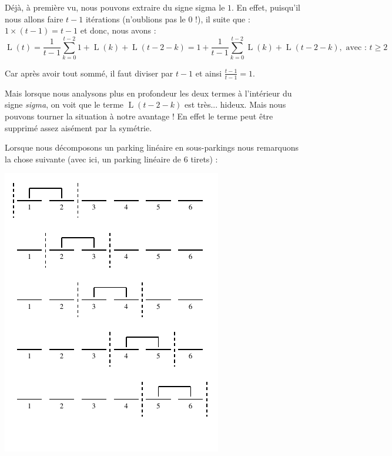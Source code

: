 \documentclass[a4paper,francais,11pt]{article}
\begin{document}
Déjà, à première vu, nous pouvons extraire du signe sigma le $1$. En effet, puisqu'il nous allons faire $t-1$ itérations (n'oublions pas le $0$ !), il suite que : $1\times\left(t-1\right)=t-1$ et donc, nous avons :
\[\operatorname{L}\left(t\right)=\frac{1}{t-1}\sum_{k=0}^{t-2}1+\operatorname{L}\left(k\right) + \operatorname{L}\left(t-2-k\right)=1+\frac{1}{t-1}\sum_{k=0}^{t-2}\operatorname{L}\left(k\right) + \operatorname{L}\left(t-2-k\right),\text{ avec : $t\geqslant2$}\]

Car après avoir tout sommé, il faut diviser par $t-1$ et ainsi $\frac{t-1}{t-1}=1$. 

Mais lorsque nous analysons plus en profondeur les deux termes à l'intérieur du signe \emph{sigma}, on voit que le terme $\operatorname{L}\left(t-2-k\right)$ est très... hideux. Mais nous pouvons tourner la situation à notre avantage ! En effet le terme peut être supprimé assez aisément par la symétrie. 

Lorsque nous décomposons un parking linéaire en sous-parkings nous remarquons la chose suivante (avec ici, un parking linéaire de $6$ tirets) :
\begin{center}
\includegraphics{fig15.pdf}
\end{center}
\end{document}

